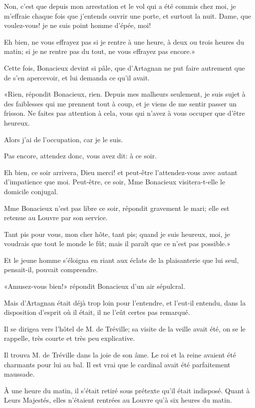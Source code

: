 \speak  Non, c'est que depuis mon arrestation et le vol qui a été commis chez moi, je m'effraie chaque fois que j'entends ouvrir une porte, et surtout la nuit. Dame, que voulez-vous! je ne suis point homme d'épée, moi! 

\speak  Eh bien, ne vous effrayez pas si je rentre à une heure, à deux ou trois heures du matin; si je ne rentre pas du tout, ne vous effrayez pas encore.» 

Cette fois, Bonacieux devint si pâle, que d'Artagnan ne put faire autrement que de s'en apercevoir, et lui demanda ce qu'il avait. 

«Rien, répondit Bonacieux, rien. Depuis mes malheurs seulement, je suis sujet à des faiblesses qui me prennent tout à coup, et je viens de me sentir passer un frisson. Ne faites pas attention à cela, vous qui n'avez à vous occuper que d'être heureux. 

\speak  Alors j'ai de l'occupation, car je le suis. 

\speak  Pas encore, attendez donc, vous avez dit: à ce soir. 

\speak  Eh bien, ce soir arrivera, Dieu merci! et peut-être l'attendez-vous avec autant d'impatience que moi. Peut-être, ce soir, Mme Bonacieux visitera-t-elle le domicile conjugal. 

\speak  Mme Bonacieux n'est pas libre ce soir, répondit gravement le mari; elle est retenue au Louvre par son service. 

\speak  Tant pis pour vous, mon cher hôte, tant pis; quand je suis heureux, moi, je voudrais que tout le monde le fût; mais il paraît que ce n'est pas possible.» 

Et le jeune homme s'éloigna en riant aux éclats de la plaisanterie que lui seul, pensait-il, pouvait comprendre. 

«Amusez-vous bien!» répondit Bonacieux d'un air sépulcral. 

Mais d'Artagnan était déjà trop loin pour l'entendre, et l'eut-il entendu, dans la disposition d'esprit où il était, il ne l'eût certes pas remarqué. 

Il se dirigea vers l'hôtel de M. de Tréville; sa visite de la veille avait été, on se le rappelle, très courte et très peu explicative. 

Il trouva M. de Tréville dans la joie de son âme. Le roi et la reine avaient été charmants pour lui au bal. Il est vrai que le cardinal avait été parfaitement maussade. 

À une heure du matin, il s'était retiré sous prétexte qu'il était indisposé. Quant à Leurs Majestés, elles n'étaient rentrées au Louvre qu'à six heures du matin. 

